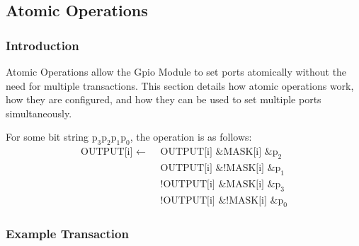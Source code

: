 \subsection{Atomic Operations}

\subsubsection{Introduction}
Atomic Operations allow the Gpio Module to set ports atomically without the need for multiple transactions. This section details how atomic operations work, how they are configured, and how they can be used to set multiple ports simultaneously.

For some bit string $\text{p}_3\text{p}_2\text{p}_1\text{p}_0$, the operation is as follows:
\begin{equation*}
  \begin{split}
    \text{OUTPUT[i] }\leftarrow\text{ }&\text{OUTPUT[i]} \text{ \& } \text{MASK[i]} \text{ \& } \text{p}_2\\
                        &\text{OUTPUT[i]} \text{ \& } \text{!MASK[i]} \text{ \& } \text{p}_1\\
                        &\text{!OUTPUT[i]} \text{ \& } \text{MASK[i]} \text{ \& } \text{p}_3\\
                        &\text{!OUTPUT[i]} \text{ \& } \text{!MASK[i]} \text{ \& } \text{p}_0
  \end{split}
\end{equation*}

\subsubsection{Example Transaction}




